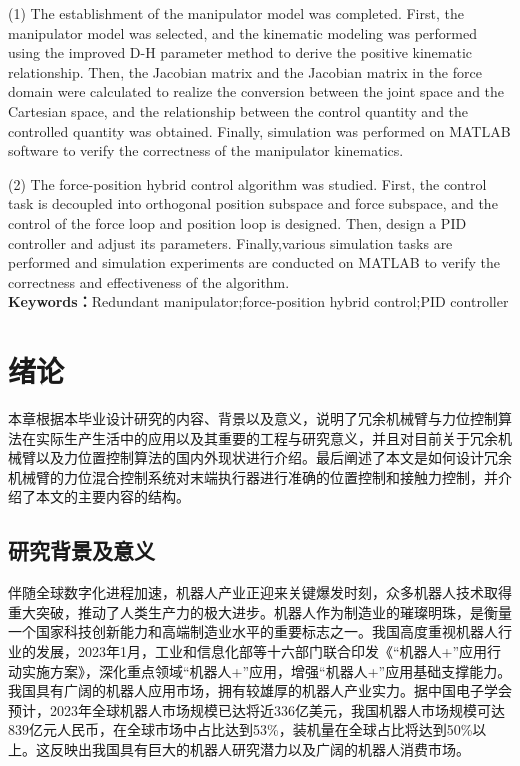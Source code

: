 \documentclass[12pt,a4paper,openany,oneside]{book}%
\numberwithin{equation}{chapter}%
\numberwithin{figure}{chapter}%
\begin{document}
(1) The establishment of the manipulator model was completed. First, the manipulator model was selected, and the kinematic modeling was performed using the improved D-H parameter method to derive the positive kinematic relationship. Then, the Jacobian matrix and the Jacobian matrix in the force domain were calculated to realize the conversion between the joint space and the Cartesian space, and the relationship between the control quantity and the controlled quantity was obtained. Finally, simulation was performed on MATLAB software to verify the correctness of the manipulator kinematics.

(2) The force-position hybrid control algorithm was studied. First, the control task is decoupled into orthogonal position subspace and force subspace, and the control of the force loop and position loop is designed. Then, design a PID controller and adjust its parameters. Finally,various simulation tasks are performed and simulation experiments are conducted on MATLAB to verify the correctness and effectiveness of the algorithm.
	\\ \textbf{\fontsize{16}{18}\selectfont {}Keywords：}Redundant manipulator;force-position hybrid control;PID controller
	
	
	
	
	
	
	
	\newpage
	\begin{center}
		\vspace*{-2.5cm} %
		\tableofcontents	
		\thispagestyle{tocstyle}

	\end{center}
    \clearpage
	\setcounter{page}{1}
\chapter{绪论}
	本章根据本毕业设计研究的内容、背景以及意义，说明了冗余机械臂与力位控制算法在实际生产生活中的应用以及其重要的工程与研究意义，并且对目前关于冗余机械臂以及力位置控制算法的国内外现状进行介绍。最后阐述了本文是如何设计冗余机械臂的力位混合控制系统对末端执行器进行准确的位置控制和接触力控制，并介绍了本文的主要内容的结构。
\section{研究背景及意义}
伴随全球数字化进程加速，机器人产业正迎来关键爆发时刻，众多机器人技术取得重大突破，推动了人类生产力的极大进步。机器人作为制造业的璀璨明珠，是衡量一个国家科技创新能力和高端制造业水平的重要标志之一。我国高度重视机器人行业的发展，2023年1月，工业和信息化部等十六部门联合印发《“机器人+”应用行动实施方案》，深化重点领域“机器人+”应用，增强“机器人+”应用基础支撑能力。我国具有广阔的机器人应用市场，拥有较雄厚的机器人产业实力。据中国电子学会预计，2023年全球机器人市场规模已达将近336亿美元，我国机器人市场规模可达839亿元人民币，在全球市场中占比达到53\%，装机量在全球占比将达到50\%以上。这反映出我国具有巨大的机器人研究潜力以及广阔的机器人消费市场。
\end{document}
